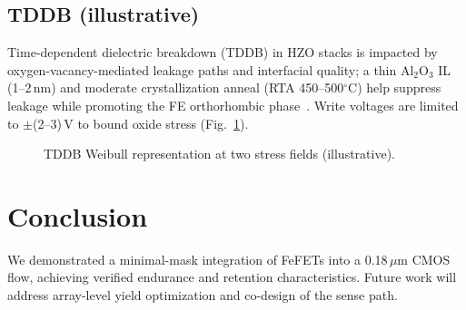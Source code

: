 \documentclass[conference]{IEEEtran}
\begin{document}
\subsection{TDDB (illustrative)}
Time-dependent dielectric breakdown (TDDB) in HZO stacks is impacted by oxygen-vacancy-mediated leakage paths and interfacial quality; a thin Al$_2$O$_3$ IL (1--2\,nm) and moderate crystallization anneal (RTA 450--500$^\circ$C) help suppress leakage while promoting the FE orthorhombic phase~\cite{Mueller2015,Park2020}. Write voltages are limited to $\pm$(2--3)\,V to bound oxide stress (Fig.~\ref{fig:tddb}).

\begin{figure}[H]
\centering
{}
\caption{TDDB Weibull representation at two stress fields (illustrative).}
\label{fig:tddb}
\end{figure}

\section{Conclusion}
We demonstrated a minimal-mask integration of FeFETs into a 0.18\,$\mu$m CMOS flow, achieving verified endurance and retention characteristics. Future work will address array-level yield optimization and co-design of the sense path.
\end{document}
